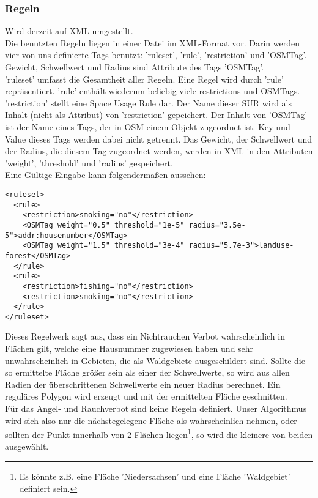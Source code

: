 \subsubsection{Regeln}
Wird derzeit auf XML umgestellt.\\
\label{sec:Eingabedaten_Wir}
Die benutzten Regeln liegen in einer Datei im XML-Format vor. Darin werden vier von uns definierte Tags benutzt: 'ruleset', 'rule',
'restriction' und 'OSMTag'. Gewicht, Schwellwert und Radius sind Attribute des Tags 'OSMTag'.\\
'ruleset' umfasst die Gesamtheit aller Regeln. Eine Regel wird durch 'rule' repräsentiert. 'rule' enthält wiederum beliebig viele 
restrictions und OSMTags. 'restriction' stellt eine Space Usage Rule dar. Der Name dieser SUR wird als Inhalt (nicht als Attribut) 
von 'restriction' gepeichert. Der Inhalt von 'OSMTag' ist der Name eines Tags, der in OSM einem Objekt zugeordnet ist. Key und Value
dieses Tags werden dabei nicht getrennt. Das Gewicht, der Schwellwert und der Radius, die diesem Tag zugeordnet werden, werden in XML
in den Attributen 'weight', 'threshold' und 'radius' gespeichert.\\
Eine Gültige Eingabe kann folgendermaßen aussehen:
\begin{lstlisting}[frame=single]
<ruleset>
  <rule>
    <restriction>smoking="no"</restriction>
    <OSMTag weight="0.5" threshold="1e-5" radius="3.5e-5">addr:housenumber</OSMTag>
    <OSMTag weight="1.5" threshold="3e-4" radius="5.7e-3">landuse-forest</OSMTag>
  </rule>
  <rule>
    <restriction>fishing="no"</restriction>
    <restriction>smoking="no"</restriction>
  </rule>
</ruleset>
\end{lstlisting}
Dieses Regelwerk sagt aus, dass ein Nichtrauchen Verbot wahrscheinlich in Flächen gilt, welche eine Hausnummer zugewiesen haben
und sehr unwahrscheinlich in Gebieten, die als Waldgebiete ausgeschildert sind. Sollte die so ermittelte Fläche größer sein als 
einer der Schwellwerte, so wird aus allen Radien der überschrittenen Schwellwerte ein neuer Radius berechnet. Ein reguläres Polygon
wird erzeugt und mit der ermittelten Fläche geschnitten.\\
Für das Angel- und Rauchverbot sind keine Regeln definiert. Unser Algorithmus wird sich also nur die nächstegelegene Fläche als wahrscheinlich nehmen,
oder sollten der Punkt innerhalb von 2 Flächen liegen\footnote{Es könnte z.B. eine Fläche 'Niedersachsen' und eine Fläche 'Waldgebiet' definiert sein.},
so wird die kleinere von beiden ausgewählt.

